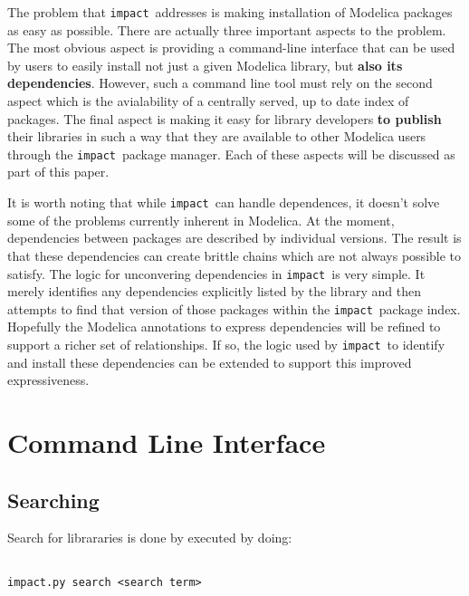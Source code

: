 \documentclass[11pt,a4paper,twocolumn]{article}
\newcommand{\impact}{\texttt{impact}} %
\begin{document}
The problem that \impact\ addresses is making installation of Modelica packages as 
easy as possible.  There are actually three important aspects to the problem.  The 
most obvious aspect is providing a command-line interface that can be used by 
users to easily install not just a given Modelica library, but \textbf{also its 
dependencies}.  However, such a command line tool must rely on the second aspect 
which is the avialability of a centrally served, up to date index of packages.  
The final aspect is making it easy for library developers \textbf{to publish} 
their libraries in such a way that they are available to other Modelica users 
through the \impact\ package manager.  Each of these aspects will be discussed as 
part of this paper.

It is worth noting that while \impact\ can handle dependences, it doesn't solve 
some of the problems currently inherent in Modelica.  At the moment, dependencies 
between packages are described by individual versions.  The result is that these 
dependencies can create brittle chains which are not always possible to satisfy.  
The logic for unconvering dependencies in \impact\ is very simple.  It merely 
identifies any dependencies explicitly listed by the library and then attempts
to find that version of those packages within the \impact\ package index.
Hopefully the Modelica annotations to express dependencies will be refined to
support a richer set of relationships.  If so, the logic used by \impact\ to
identify and install these dependencies can be extended to support this
improved expressiveness.

\section{Command Line Interface}
\label{sec:command_line}




\subsection{Searching} %
\label{cmd:search}

Search for librararies is done by executed by doing:
\lstset{language=bash}
\begin{lstlisting}[frame=shadowbox]  % Start your code-block

impact.py search <search term>
\end{lstlisting}
\end{document}
